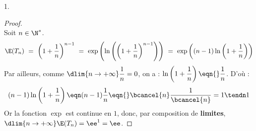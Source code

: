 \documentclass[11pt]{article}%
\begin{document}
\begin{noliste}{1.}
  \begin{proof}~\\
    Soit $n\in\N^*$.
    \[
    \E(T_n) \ = \ \left(1+\dfrac{1}{n}\right)^{n-1}
    \ = \ \exp \left(\ln\left(\left(1+\dfrac{1}{n}\right)^{n-1} 
      \right)\right)
    \ = \ \exp\left( (n-1) \ln\left( 1+\dfrac{1}{n}\right)\right)
    \]
    Par ailleurs, comme $\dlim{n\to+\infty}\dfrac{1}{n} = 0$, on a :
    $\ln\left(1+\dfrac{1}{n}\right) \eqn{} \dfrac{1}{n}$.
    D'où :
    \[
    (n-1)\ln\left(1+\dfrac{1}{n}\right) \eqn (n-1)\dfrac{1}{n} \eqn{}
    \bcancel{n}\dfrac{1}{\bcancel{n}} = 1 \tendn 1
    \]
    Or la fonction $\exp$ est continue en $1$, donc, par composition
    de {\bf limites}, $\dlim{n\to+\infty} \E(T_n) = \ee^1 = \ee$.%
    
    
    \newpage



\end{proof}
\end{noliste}
\end{document}
